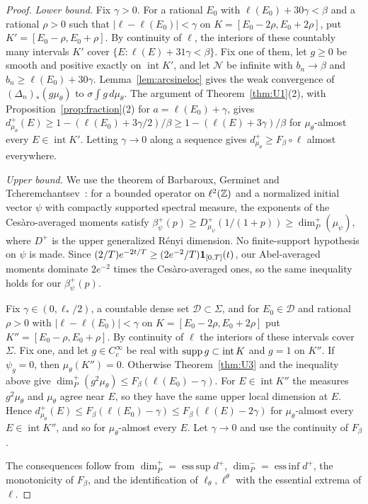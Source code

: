 \begin{proof}
\emph{Lower bound.} Fix $\gamma>0$. For a rational $E_0$ with $\ell(E_0)+30\gamma<\beta$ and a rational $\rho>0$ such that $|\ell-\ell(E_0)|<\gamma$ on $K=[E_0-2\rho,E_0+2\rho]$, put $K'=[E_0-\rho,E_0+\rho]$. By continuity of $\ell$, the interiors of these countably many intervals $K'$ cover $\{E:\ell(E)+31\gamma<\beta\}$. Fix one of them, let $g\ge0$ be smooth and positive exactly on $\operatorname{int}K'$, and let $\mathcal N$ be infinite with $b_n\to\beta$ and $b_n\ge\ell(E_0)+30\gamma$. Lemma~\ref{lem:arcsineloc} gives the weak convergence of $(\Delta_n)_*(g\mu_\theta)$ to $\sigma\int g\,d\mu_\theta$. The argument of Theorem~\ref{thm:U1}(2), with Proposition~\ref{prop:fraction}(2) for $a=\ell(E_0)+\gamma$, gives $d^+_{\mu_\theta}(E)\ge1-(\ell(E_0)+3\gamma/2)/\beta\ge1-(\ell(E)+3\gamma)/\beta$ for $\mu_\theta$-almost every $E\in\operatorname{int}K'$. Letting $\gamma\to0$ along a sequence gives $d^+_{\mu_\theta}\ge F_\beta\circ\ell$ almost everywhere.

\emph{Upper bound.} We use the theorem of Barbaroux, Germinet and Tcheremchantsev~\cite[Theorem~1 and Proposition~1(iii)]{BGT2000}: for a bounded operator on $\ell^2(\mathbb Z)$ and a normalized initial vector $\psi$ with compactly supported spectral measure, the exponents of the Ces\`aro-averaged moments satisfy $\beta^+_\psi(p)\ge D^+_{\mu_\psi}(1/(1+p))\ge\dim_P^+(\mu_\psi)$, where $D^+$ is the upper generalized R\'enyi dimension. No finite-support hypothesis on $\psi$ is made. Since $(2/T)e^{-2t/T}\ge(2e^{-2}/T)\mathbf 1_{[0,T]}(t)$, our Abel-averaged moments dominate $2e^{-2}$ times the Ces\`aro-averaged ones, so the same inequality holds for our $\beta^+_\psi(p)$.

Fix $\gamma\in(0,\ell_*/2)$, a countable dense set $\mathcal D\subset\Sigma$, and for $E_0\in\mathcal D$ and rational $\rho>0$ with $|\ell-\ell(E_0)|<\gamma$ on $K=[E_0-2\rho,E_0+2\rho]$ put $K''=[E_0-\rho,E_0+\rho]$. By continuity of $\ell$ the interiors of these intervals cover $\Sigma$. Fix one, and let $g\in C_c^\infty$ be real with $\operatorname{supp} g\subset\operatorname{int}K$ and $g=1$ on $K''$. If $\psi_g=0$, then $\mu_\theta(K'')=0$. Otherwise Theorem~\ref{thm:U3} and the inequality above give $\dim_P^+(g^2\mu_\theta)\le F_\beta(\ell(E_0)-\gamma)$. For $E\in\operatorname{int}K''$ the measures $g^2\mu_\theta$ and $\mu_\theta$ agree near $E$, so they have the same upper local dimension at $E$. Hence $d^+_{\mu_\theta}(E)\le F_\beta(\ell(E_0)-\gamma)\le F_\beta(\ell(E)-2\gamma)$ for $\mu_\theta$-almost every $E\in\operatorname{int}K''$, and so for $\mu_\theta$-almost every $E$. Let $\gamma\to0$ and use the continuity of $F_\beta$.

The consequences follow from $\dim_P^+=\operatorname{ess\,sup}d^+$, $\dim_P^-=\operatorname{ess\,inf}d^+$, the monotonicity of $F_\beta$, and the identification of $\ell_\theta,\ell^\theta$ with the essential extrema of $\ell$.
\end{proof}

